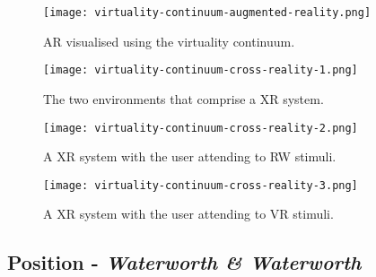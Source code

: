 \begin{figure}[h]
	\begin{center}
		\texttt{[image: virtuality-continuum-augmented-reality.png]}
		\caption{AR visualised using the virtuality continuum.}
		\label{virtuality-continuum-augmented-reality}
	\end{center}
\end{figure}

\begin{figure}[h]
	\begin{center}
		\texttt{[image: virtuality-continuum-cross-reality-1.png]}
		\caption{The two environments that comprise a XR system.}
		\label{virtuality-continuum-cross-reality-1}
	\end{center}
\end{figure}

\begin{figure}[h]
	\begin{center}
		\texttt{[image: virtuality-continuum-cross-reality-2.png]}
		\caption{A XR system with the user attending to RW stimuli.}
		\label{virtuality-continuum-cross-reality-2}
	\end{center}
\end{figure}

\begin{figure}[h]
	\begin{center}
		\texttt{[image: virtuality-continuum-cross-reality-3.png]}
		\caption{A XR system with the user attending to VR stimuli.}
		\label{virtuality-continuum-cross-reality-3}
	\end{center}
\end{figure}

\clearpage


\subsection{Position - \textit{Waterworth \& Waterworth}}
\label{waterworth}
\newcommand{\presencefootnote}{\footnote{\textbf{Presence} in this context is defined as a state of heightened perceptual processing of environmental stimuli (\textit{``a psychological focus on direct perceptual processing''}~\cite{Waterworth2001}) accompanied by lessened conceptual reasoning, whether these environmental stimuli originate from a real environment, a virtual environment, a mixed reality environment, or even from multiple discrete environments.}}

